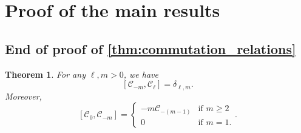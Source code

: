 \documentclass[12pt]{amsart}
\newtheorem{thm}{Theorem}[section]
\theoremstyle{remark}
\newcommand{\C}{\mathcal C}
\begin{document}
\section{Proof of the main results}\label{sec:proof_main}
\subsection{End of proof of \texorpdfstring{\cref{thm:commutation_relations}}{the first main theorem}}





\begin{thm}\label{thm:commutation_relations_pos_neg}
    For any $\ell,m>0$, we have
\begin{equation}\label{eq:commutation_relations}
      [\C_{-m},\C_\ell]=\delta_{\ell,m}.  
    \end{equation}
Moreover, 
\begin{equation}\label{eq:commutation_relations2}
    [\C_0,\C_{-m}]=
    \begin{cases}
        -m\C_{-(m-1)}&\text{if }m\geq 2\\
        0&\text{if }m=1.
    \end{cases}.
\end{equation}
\end{thm}
\end{document}
